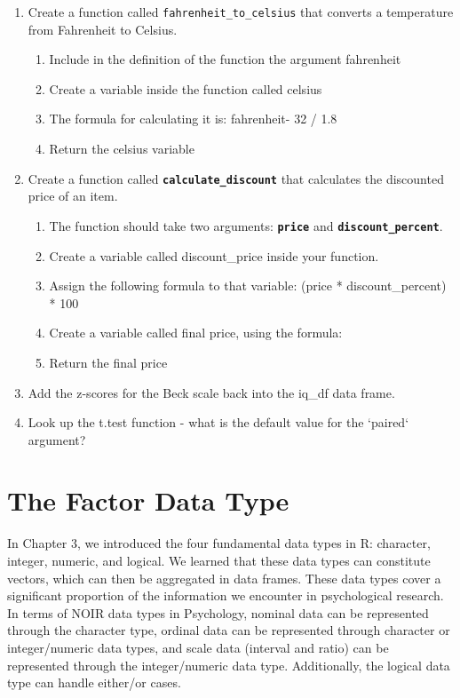 \documentclass[
]{book}
\begin{document}
\begin{enumerate}
\def\labelenumi{\arabic{enumi}.}
\item
  Create a function called \texttt{fahrenheit\_to\_celsius} that converts a temperature from Fahrenheit to Celsius.

  \begin{enumerate}
  \def\labelenumii{\arabic{enumii}.}
  \item
    Include in the definition of the function the argument fahrenheit
  \item
    Create a variable inside the function called celsius
  \item
    The formula for calculating it is: fahrenheit- 32 / 1.8
  \item
    Return the celsius variable
  \end{enumerate}
\item
  Create a function called \textbf{\texttt{calculate\_discount}} that calculates the discounted price of an item.

  \begin{enumerate}
  \def\labelenumii{\arabic{enumii}.}
  \item
    The function should take two arguments: \textbf{\texttt{price}} and \textbf{\texttt{discount\_percent}}.
  \item
    Create a variable called discount\_price inside your function.
  \item
    Assign the following formula to that variable: (price * discount\_percent) * 100
  \item
    Create a variable called final price, using the formula:
  \item
    Return the final price
  \end{enumerate}
\item
  Add the z-scores for the Beck scale back into the iq\_df data frame.
\item
  Look up the t.test function - what is the default value for the `paired` argument?
\end{enumerate}

\hypertarget{the-factor-data-type}{%
\section{The Factor Data Type}\label{the-factor-data-type}}

In Chapter 3, we introduced the four fundamental data types in R: character, integer, numeric, and logical. We learned that these data types can constitute vectors, which can then be aggregated in data frames. These data types cover a significant proportion of the information we encounter in psychological research. In terms of NOIR data types in Psychology, nominal data can be represented through the character type, ordinal data can be represented through character or integer/numeric data types, and scale data (interval and ratio) can be represented through the integer/numeric data type. Additionally, the logical data type can handle either/or cases.
\end{document}
